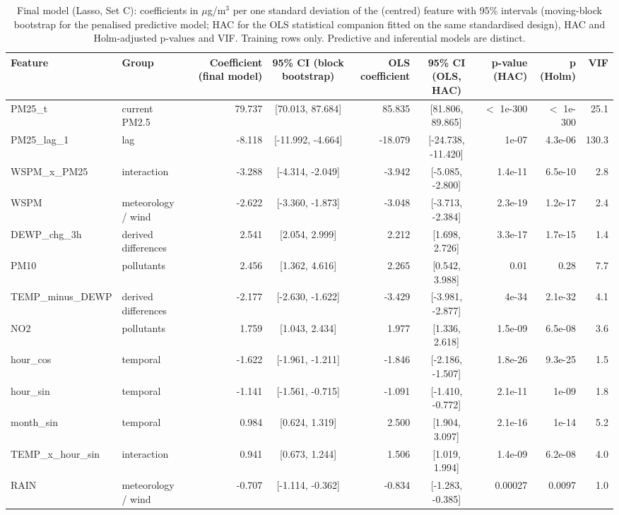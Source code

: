 \begin{table}[t]
\centering
\small
\caption{Final model (Lasso, Set C): coefficients in $\mu$g/m$^3$ per one standard deviation of the (centred) feature with 95\% intervals (moving-block bootstrap for the penalised predictive model; HAC for the OLS statistical companion fitted on the same standardised design), HAC and Holm-adjusted p-values and VIF. Training rows only. Predictive and inferential models are distinct.}
\label{tab:table_5_final_model_coefficients}
\begin{tabular}{llrcrcrrr}
\toprule
Feature & Group & Coefficient (final model) & 95\% CI (block bootstrap) & OLS coefficient & 95\% CI (OLS, HAC) & p-value (HAC) & p (Holm) & VIF \\
\midrule
PM25\_t & current PM2.5 & 79.737 & [70.013, 87.684] & 85.835 & [81.806, 89.865] & $<$ 1e-300 & $<$ 1e-300 & 25.1 \\
PM25\_lag\_1 & lag & -8.118 & [-11.992, -4.664] & -18.079 & [-24.738, -11.420] & 1e-07 & 4.3e-06 & 130.3 \\
WSPM\_x\_PM25 & interaction & -3.288 & [-4.314, -2.049] & -3.942 & [-5.085, -2.800] & 1.4e-11 & 6.5e-10 & 2.8 \\
WSPM & meteorology / wind & -2.622 & [-3.360, -1.873] & -3.048 & [-3.713, -2.384] & 2.3e-19 & 1.2e-17 & 2.4 \\
DEWP\_chg\_3h & derived differences & 2.541 & [2.054, 2.999] & 2.212 & [1.698, 2.726] & 3.3e-17 & 1.7e-15 & 1.4 \\
PM10 & pollutants & 2.456 & [1.362, 4.616] & 2.265 & [0.542, 3.988] & 0.01 & 0.28 & 7.7 \\
TEMP\_minus\_DEWP & derived differences & -2.177 & [-2.630, -1.622] & -3.429 & [-3.981, -2.877] & 4e-34 & 2.1e-32 & 4.1 \\
NO2 & pollutants & 1.759 & [1.043, 2.434] & 1.977 & [1.336, 2.618] & 1.5e-09 & 6.5e-08 & 3.6 \\
hour\_cos & temporal & -1.622 & [-1.961, -1.211] & -1.846 & [-2.186, -1.507] & 1.8e-26 & 9.3e-25 & 1.5 \\
hour\_sin & temporal & -1.141 & [-1.561, -0.715] & -1.091 & [-1.410, -0.772] & 2.1e-11 & 1e-09 & 1.8 \\
month\_sin & temporal & 0.984 & [0.624, 1.319] & 2.500 & [1.904, 3.097] & 2.1e-16 & 1e-14 & 5.2 \\
TEMP\_x\_hour\_sin & interaction & 0.941 & [0.673, 1.244] & 1.506 & [1.019, 1.994] & 1.4e-09 & 6.2e-08 & 4.0 \\
RAIN & meteorology / wind & -0.707 & [-1.114, -0.362] & -0.834 & [-1.283, -0.385] & 0.00027 & 0.0097 & 1.0 \\

\end{tabular}
\end{table}
